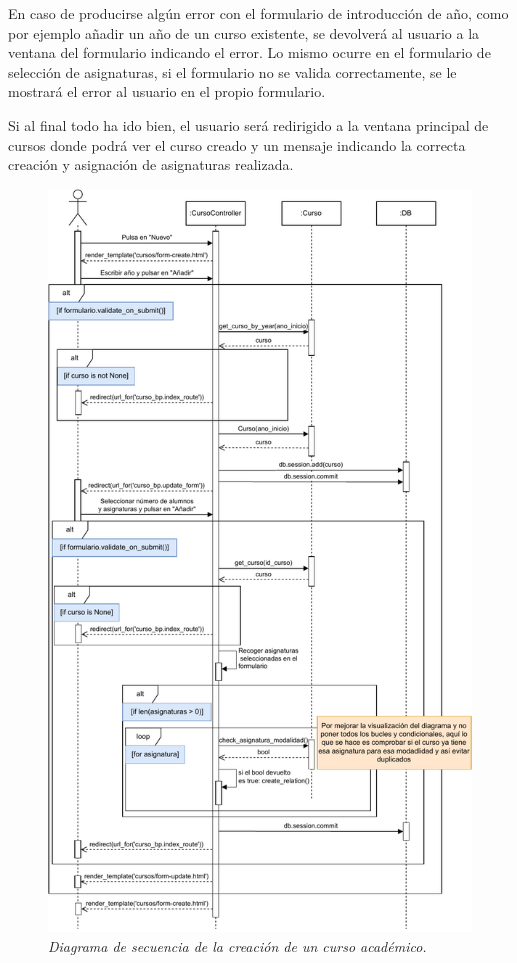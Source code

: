 \begin{itemize}
En caso de producirse algún error con el formulario de introducción de año, como por ejemplo añadir un año de un curso existente, se devolverá al usuario a la ventana del formulario indicando el error. Lo mismo ocurre en el formulario de selección de asignaturas, si el formulario no se valida correctamente, se le mostrará el error al usuario en el propio formulario.

Si al final todo ha ido bien, el usuario será redirigido a la ventana principal de cursos donde podrá ver el curso creado y un mensaje indicando la correcta creación y asignación de asignaturas realizada.


\begin{figure}
	\centering
	\includegraphics[width=\textwidth]{../img/Anexos/Diagramas secuencia/DS - crear curso.pdf}
	\caption{\textit{Diagrama de secuencia de la creación de un curso académico.}}\label{DS-crearCurso}
\end{figure}



\end{itemize}

